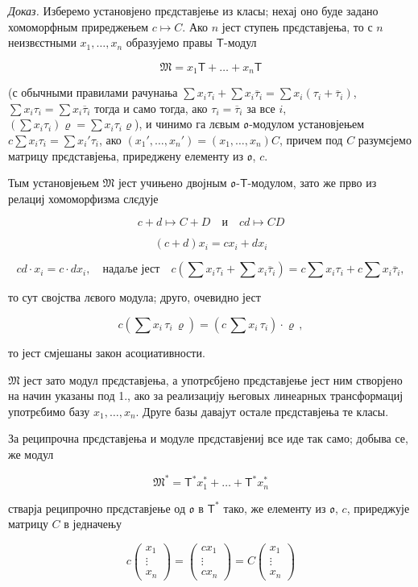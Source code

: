 \documentclass[11pt]{article}
\begin{document}
\emph{Доказ.} Изберемо установјено прєдставјење из класы; нехај оно буде задано хомоморфным приреджењем \(c\mapsto C\). Ако \(n\) јест ступењ прєдставјења, то с \(n\) неизвєстными \(x_1,\ldots,x_n\) образујемо правы \(\mathsf T\)-модул

\[\mathfrak{M} = x_1 \mathsf{T} + \dots + x_n \mathsf{T}\]

(с обычными правилами рачунања \(\sum x_i\tau_i+\sum x_i\overline{\tau}_i=\sum x_i(\tau_i+\overline{\tau}_i)\), \(\sum x_i\tau_i=\sum x_i\overline{\tau}_i\) тогда и само тогда, ако \(\tau_i=\overline{\tau}_i\) за все \(i\), \((\sum x_i\tau_i)\varrho=\sum x_i\tau_i\varrho\)), и чинимо га лєвым \(\mathfrak{o}\)-модулом установјењем \(c\sum x_i\tau_i=\sum x_i'\tau_i\), ако \((x_1',\ldots,x_n')=(x_1,\ldots,x_n)C\), причем под \(C\) разумєјемо матрицу прєдставјења, приреджену елементу из \(\mathfrak{o}\), \(c\).

Тым установјењем \(\mathfrak M\) јест учињено двојным \(\mathfrak{o}\)-\(\mathsf T\)-модулом, зато же прво из релациј хомоморфизма слєдује

\[
c+d\mapsto C+D \quad \text{и} \quad cd\mapsto CD
\]

\[
(c+d)x_i=cx_i+dx_i
\]

\[
cd\cdot x_i=c\cdot dx_i,\quad\text{надаље јест}\quad
c\left(\sum x_i\tau_i+\sum x_i\overline{\tau}_i\right)
=c\sum x_i\tau_i+c\sum x_i\overline{\tau}_i,
\]

то сут својства лєвого модула; друго, очевидно јест

\[c(\sum x_i \, \tau_i \, \varrho) = (c \, \sum x_i \, \tau_i) \cdot \varrho \,,\]

то јест смјешаны закон асоциативности.

\(\mathfrak{M}\) јест зато модул прєдставјења, а употрєбјено прєдставјење јест ним створјено на начин указаны под 1., ако за реализацију његовых линеарных трансформациј употрєбимо базу \(x_1, \ldots, x_n\). Друге базы давајут остале прєдставјења те класы.

За реципрочна прєдставјења и модуле прєдставјениј все иде так само; добыва се, же модул

\[\mathfrak{M}^* = \mathsf{T}^* x_1^* + \dots + \mathsf{T}^* x_n^*\]

стварја реципрочно прєдставјење од \(\mathfrak{o}\) в \(\mathsf T^*\) тако, же елементу из \(\mathfrak{o}\), \(c\), приреджује матрицу \(C\) в једначењу

\[
c\begin{pmatrix}x_1\\ \vdots\\ x_n\end{pmatrix}
=\begin{pmatrix}cx_1\\ \vdots\\ cx_n\end{pmatrix}
=C\begin{pmatrix}x_1\\ \vdots\\ x_n\end{pmatrix}
\]
\end{document}
